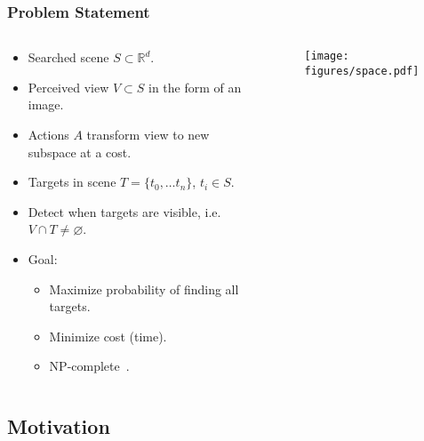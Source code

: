 \begin{frame}
    \frametitle{Problem Statement}

    \begin{columns}
        \begin{column}{0.6\textwidth}
            \begin{itemize}
                \item Searched scene \(S \subset \mathbb{R}^d\).
                \item Perceived view \(V \subset S\) in the form of an image.
                \item Actions \(A\) transform view to new subspace at a cost.
                \item Targets in scene \(T = \{t_0, \dots t_n\}\), \(t_i \in S\).
                \item Detect when targets are visible, i.e. \(V \cap T \neq \varnothing\). 
                \item Goal:
                \begin{itemize}
                    \item Maximize probability of finding all targets.
                    \item Minimize cost (time).
                    \item NP-complete~\cite{andreopoulos_theory_2009}. %
                \end{itemize}
            \end{itemize}
        \end{column}
        \begin{column}{0.4\textwidth}
            \begin{figure}
                \centering
                \texttt{[image: figures/space.pdf]}
            \end{figure}
        \end{column}
    \end{columns}   

\end{frame}

\subsection{Motivation}

